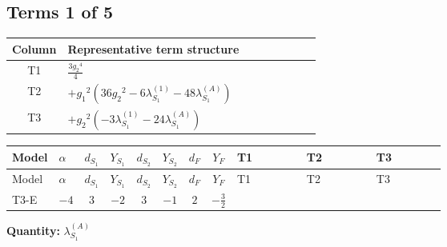 \documentclass[8pt]{article}
\begin{document}
\begin{landscape}
\subsection*{Terms 1 of 5}
\begin{center}
\begin{tabular}{@{}c >{\raggedright\arraybackslash}p{0.82\linewidth}@{}}
\toprule
Column & Representative term structure \\
\midrule
T1 & \(\displaystyle \frac{3 {g_2}^4}{4}\) \\
\midrule
T2 & \(\displaystyle +{g_1}^2 \left(36 {g_2}^2-6 {\lambda_{S_1}^{(1)}}-48 {\lambda_{S_1}^{(A)}}\right)\) \\
\midrule
T3 & \(\displaystyle +{g_2}^2 (-3 {\lambda_{S_1}^{(1)}}-24 {\lambda_{S_1}^{(A)}})\) \\
\midrule
\bottomrule
\end{tabular}
\end{center}
\smallskip
\tiny
\begin{longtable}{@{}llcccccc >{\raggedright\arraybackslash}p{0.21\linewidth} >{\raggedright\arraybackslash}p{0.21\linewidth} >{\raggedright\arraybackslash}p{0.21\linewidth}@{}}
\toprule
Model & $\alpha$ & $d_{S_1}$ & $Y_{S_1}$ & $d_{S_2}$ & $Y_{S_2}$ & $d_F$ & $Y_F$ & T1 & T2 & T3 \\
\midrule
\endfirsthead
\toprule
Model & $\alpha$ & $d_{S_1}$ & $Y_{S_1}$ & $d_{S_2}$ & $Y_{S_2}$ & $d_F$ & $Y_F$ & T1 & T2 & T3 \\
\midrule
\endhead
T3-E & $-4$ & $3$ & $-2$ & $3$ & $-1$ & $2$ & $-\frac{3}{2}$ & \scriptsize\adjustbox{max width=\linewidth}{$\begin{gathered} \frac{3 {g_2}^4}{4}\end{gathered}$} & \scriptsize\adjustbox{max width=\linewidth}{$\begin{gathered} +{g_1}^2 \left(36 {g_2}^2-6 {\lambda_{S_1}^{(1)}}-48 {\lambda_{S_1}^{(A)}}\right)\end{gathered}$} & \scriptsize\adjustbox{max width=\linewidth}{$\begin{gathered} +{g_2}^2 (-3 {\lambda_{S_1}^{(1)}}-24 {\lambda_{S_1}^{(A)}})\end{gathered}$} \\
\midrule
\bottomrule
\end{longtable}
\clearpage
\noindent\textbf{Quantity: }$\lambda_{S_1}^{(A)}$\par\smallskip

\end{landscape}
\end{document}
